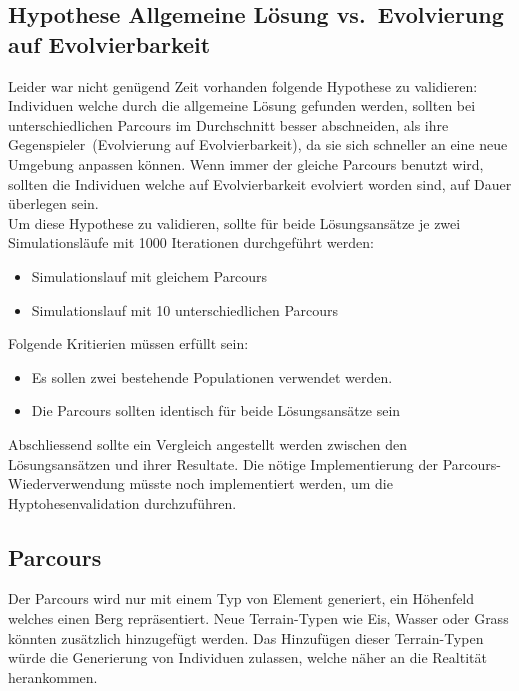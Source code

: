     \subsection{Hypothese Allgemeine Lösung vs.\ Evolvierung auf Evolvierbarkeit\label{sub:hypoAnsatz}}

      Leider war nicht genügend Zeit vorhanden folgende Hypothese zu validieren:
      Individuen welche durch die allgemeine Lösung gefunden werden,
      sollten bei unterschiedlichen Parcours im Durchschnitt besser abschneiden,
      als ihre Gegenspieler~(Evolvierung auf Evolvierbarkeit),
      da sie sich schneller an eine neue Umgebung anpassen können.
      Wenn immer der gleiche Parcours benutzt wird,
      sollten die Individuen welche auf Evolvierbarkeit evolviert worden sind, auf Dauer überlegen sein.
      \\
      Um diese Hypothese zu validieren,
      sollte für beide Lösungsansätze je zwei Simulationsläufe mit 1000 Iterationen durchgeführt werden:

      \begin{itemize}
        \item Simulationslauf mit gleichem Parcours
        \item Simulationslauf mit 10 unterschiedlichen Parcours
      \end{itemize}

      Folgende Kritierien müssen erfüllt sein:

      \begin{itemize}
        \item Es sollen zwei bestehende Populationen verwendet werden.
        \item Die Parcours sollten identisch für beide Lösungsansätze sein
      \end{itemize}

      Abschliessend sollte ein Vergleich angestellt werden zwischen den Lösungsansätzen und ihrer Resultate.
      Die nötige Implementierung der Parcours-Wiederverwendung müsste noch implementiert werden, um die Hyptohesenvalidation durchzuführen.

    \subsection{Parcours}

      Der Parcours wird nur mit einem Typ von Element generiert, ein Höhenfeld welches einen Berg repräsentiert.
      Neue Terrain-Typen wie Eis, Wasser oder Grass könnten zusätzlich hinzugefügt werden.
      Das Hinzufügen dieser Terrain-Typen würde die Generierung von Individuen zulassen, welche näher an die Realtität herankommen.

